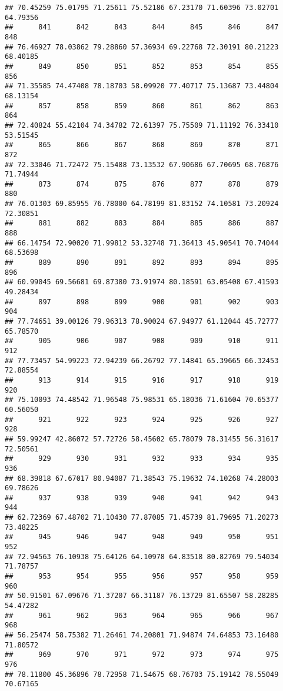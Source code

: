 \documentclass[
]{article}
\begin{document}
\begin{verbatim}
## 70.45259 75.01795 71.25611 75.52186 67.23170 71.60396 73.02701 64.79356 
##      841      842      843      844      845      846      847      848 
## 76.46927 78.03862 79.28860 57.36934 69.22768 72.30191 80.21223 68.40185 
##      849      850      851      852      853      854      855      856 
## 71.35585 74.47408 78.18703 58.09920 77.40717 75.13687 73.44804 68.13154 
##      857      858      859      860      861      862      863      864 
## 72.40824 55.42104 74.34782 72.61397 75.75509 71.11192 76.33410 53.51545 
##      865      866      867      868      869      870      871      872 
## 72.33046 71.72472 75.15488 73.13532 67.90686 67.70695 68.76876 71.74944 
##      873      874      875      876      877      878      879      880 
## 76.01303 69.85955 76.78000 64.78199 81.83152 74.10581 73.20924 72.30851 
##      881      882      883      884      885      886      887      888 
## 66.14754 72.90020 71.99812 53.32748 71.36413 45.90541 70.74044 68.53698 
##      889      890      891      892      893      894      895      896 
## 60.99045 69.56681 69.87380 73.91974 80.18591 63.05408 67.41593 49.28434 
##      897      898      899      900      901      902      903      904 
## 77.74651 39.00126 79.96313 78.90024 67.94977 61.12044 45.72777 65.78570 
##      905      906      907      908      909      910      911      912 
## 77.73457 54.99223 72.94239 66.26792 77.14841 65.39665 66.32453 72.88554 
##      913      914      915      916      917      918      919      920 
## 75.10093 74.48542 71.96548 75.98531 65.18036 71.61604 70.65377 60.56050 
##      921      922      923      924      925      926      927      928 
## 59.99247 42.86072 57.72726 58.45602 65.78079 78.31455 56.31617 72.50561 
##      929      930      931      932      933      934      935      936 
## 68.39818 67.67017 80.94087 71.38543 75.19632 74.10268 74.28003 69.78626 
##      937      938      939      940      941      942      943      944 
## 62.72369 67.48702 71.10430 77.87085 71.45739 81.79695 71.20273 73.48225 
##      945      946      947      948      949      950      951      952 
## 72.94563 76.10938 75.64126 64.10978 64.83518 80.82769 79.54034 71.78757 
##      953      954      955      956      957      958      959      960 
## 50.91501 67.09676 71.37207 66.31187 76.13729 81.65507 58.28285 54.47282 
##      961      962      963      964      965      966      967      968 
## 56.25474 58.75382 71.26461 74.20801 71.94874 74.64853 73.16480 71.80572 
##      969      970      971      972      973      974      975      976 
## 78.11800 45.36896 78.72958 71.54675 68.76703 75.19142 78.55049 70.67165 

\end{verbatim}
\end{document}
